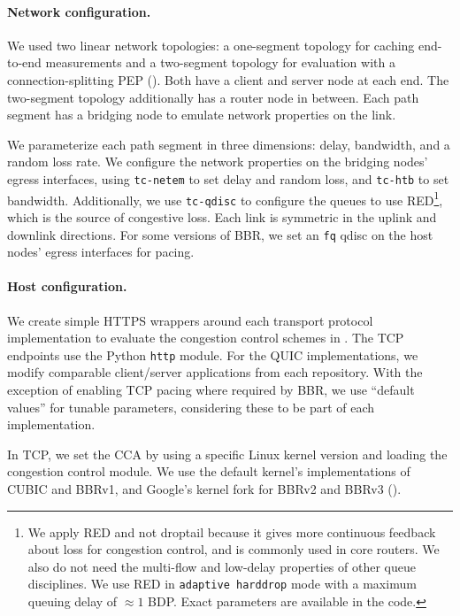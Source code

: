 \paragraph{Network configuration.}

We used two linear network topologies: a one-segment topology for caching
end-to-end measurements and a two-segment topology for evaluation with a
connection-splitting PEP (). Both have
a client and server node at each end. The two-segment topology additionally has
a router node in between. Each path segment has a bridging node to emulate network
properties on the link.

We parameterize each path segment in three dimensions: delay, bandwidth, and a
random loss rate. We configure the network properties on the bridging nodes'
egress interfaces, using \texttt{tc-netem} to set delay and random loss,
and \texttt{tc-htb} to set bandwidth. Additionally, we use \texttt{tc-qdisc} to
configure the queues to use RED\footnote{We apply RED and not droptail because it gives more
continuous feedback about loss for congestion control, and is commonly used in
core routers. We also do not need the multi-flow and low-delay properties of
other queue disciplines. We use RED in \texttt{adaptive harddrop} mode with a
maximum queuing delay of $\approx1$ BDP. Exact parameters are available in the code.},
which is the source of congestive loss.
Each link is symmetric in
the uplink and downlink directions. For some versions of BBR, we set an \texttt
{fq} qdisc on the host nodes' egress interfaces for pacing.

\paragraph{Host configuration.}

We create simple HTTPS wrappers around each transport protocol implementation to
evaluate the congestion control schemes in . The TCP
endpoints use the Python \texttt{http} module. For the QUIC implementations, we
modify comparable client/server applications from each repository.
With the exception of enabling TCP pacing where required by BBR, we use
``default values'' for tunable parameters, considering these to be part of each
implementation.

In TCP, we set the CCA by using a specific Linux kernel
version and loading the congestion control module. We use the default
kernel's implementations of CUBIC and BBRv1, and Google's kernel fork for
BBRv2 and BBRv3 ().

